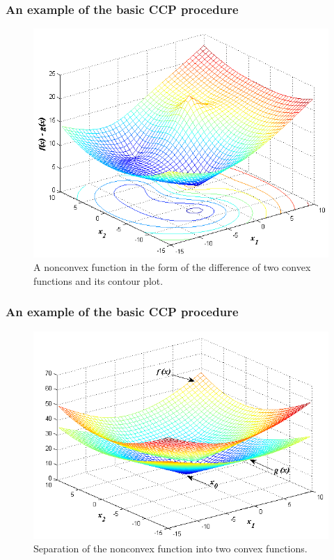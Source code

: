 \documentclass [t] {beamer} %
\begin{document}
\begin{frame} %
\frametitle{An example of the basic CCP procedure}
\begin{figure}[h]
\includegraphics[height=0.7\textheight]{../figures/ccp/ccp_a.png}
\caption{A nonconvex function in the form of the difference of two convex
functions and its contour plot.}
\label{fig:ccp_a}
\end{figure}
\end{frame}

\begin{frame} %
\frametitle{An example of the basic CCP procedure}
\begin{figure}[h]
\includegraphics[height=0.7\textheight]{../figures/ccp/ccp_b.png}
\caption{Separation of the nonconvex function into two convex functions.}
\label{fig:ccp_b}
\end{figure}
\end{frame}
\end{document}
